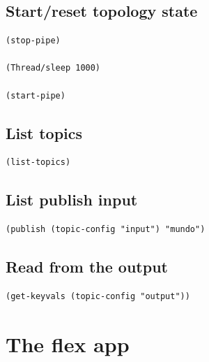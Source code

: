 \documentclass[11pt]{article}
\begin{document}
\subsection{Start/reset topology state}
\label{sec:orgd2c2b7a}
\begin{verbatim}
(stop-pipe)

(Thread/sleep 1000)

(start-pipe)
\end{verbatim}

\subsection{List topics}
\label{sec:orgb388eb7}
\begin{verbatim}
(list-topics)
\end{verbatim}
\subsection{List publish input}
\label{sec:orge4f9847}
\begin{verbatim}
(publish (topic-config "input") "mundo")
\end{verbatim}
\subsection{Read from the output}
\label{sec:orgd528830}
\begin{verbatim}
(get-keyvals (topic-config "output"))
\end{verbatim}
\section{The flex app}
\label{sec:org74afadb}
\end{document}
